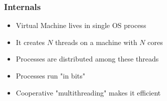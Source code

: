 \begin{frame}
    \frametitle{Internals}
    \begin{itemize}
        \item Virtual Machine lives in single OS process
        \item It creates $N$ threads on a machine with $N$ cores
        \item Processes are distributed among these threads
        \item Processes run "in bits"
        \item Cooperative "multithreading" makes it efficient
    \end{itemize}
\end{frame}

